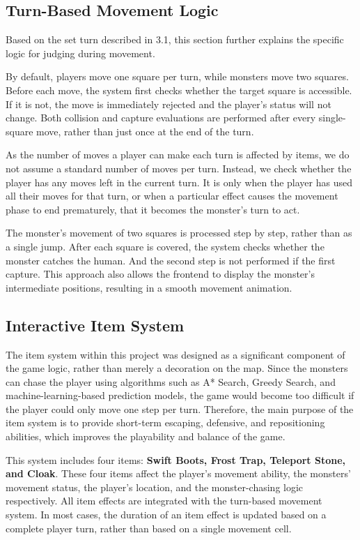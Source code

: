 \documentclass[12pt,a4paper]{article}
\begin{document}
\subsection{Turn-Based Movement Logic}

Based on the set turn described in 3.1, this section further explains the specific logic for judging during movement.

By default, players move one square per turn, while monsters move two squares. Before each move, the system first checks whether the target square is accessible. If it is not, the move is immediately rejected and the player's status will not change. Both collision and capture evaluations are performed after every single-square move, rather than just once at the end of the turn.

As the number of moves a player can make each turn is affected by items, we do not assume a standard number of moves per turn. Instead, we check whether the player has any moves left in the current turn. It is only when the player has used all their moves for that turn, or when a particular effect causes the movement phase to end prematurely, that it becomes the monster's turn to act.

The monster's movement of two squares is processed step by step, rather than as a single jump. After each square is covered, the system checks whether the monster catches the human. And the second step is not performed if the first capture. This approach also allows the frontend to display the monster's intermediate positions, resulting in a smooth movement animation.

\subsection{Interactive Item System}

The item system within this project was designed as a significant component of the game logic, rather than merely a decoration on the map. Since the monsters can chase the player using algorithms such as A* Search, Greedy Search, and machine-learning-based prediction models, the game would become too difficult if the player could only move one step per turn. Therefore, the main purpose of the item system is to provide short-term escaping, defensive, and repositioning abilities, which improves the playability and balance of the game.

This system includes four items: \textbf{Swift Boots, Frost Trap, Teleport Stone, and Cloak}. These four items affect the player’s movement ability, the monsters’ movement status, the player’s location, and the monster-chasing logic respectively. All item effects are integrated with the turn-based movement system. In most cases, the duration of an item effect is updated based on a complete player turn, rather than based on a single movement cell.
\end{document}
